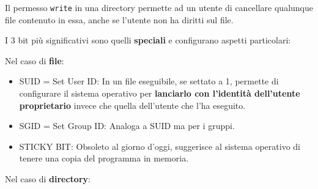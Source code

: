 \documentclass[a4paper]{report}
\newenvironment{info}{\begin{tcolorbox}[fonttitle=\sffamily\bfseries\large,title=Info,colframe=blue!75!white]}{\end{tcolorbox}}
\begin{document}
\begin{info}
	Il permesso \texttt{write} in una directory permette ad un utente di cancellare qualunque file contenuto in essa, anche se l'utente non ha diritti sul file.
\end{info}

I 3 bit più significativi sono quelli \textbf{speciali} e configurano aspetti particolari:

Nel caso di \textbf{file}:

\begin{itemize}
	\item SUID = Set User ID: In un file eseguibile, se settato a 1, permette di configurare il sistema operativo per \textbf{lanciarlo con l'identità dell'utente proprietario} invece che quella dell'utente che l'ha eseguito.
	
	\item SGID = Set Group ID: Analoga a SUID ma per i gruppi.
	
	\item STICKY BIT: Obsoleto al giorno d'oggi, suggerisce al sistema operativo di tenere una copia del programma in memoria.
\end{itemize}

Nel caso di \textbf{directory}:
\end{document}
